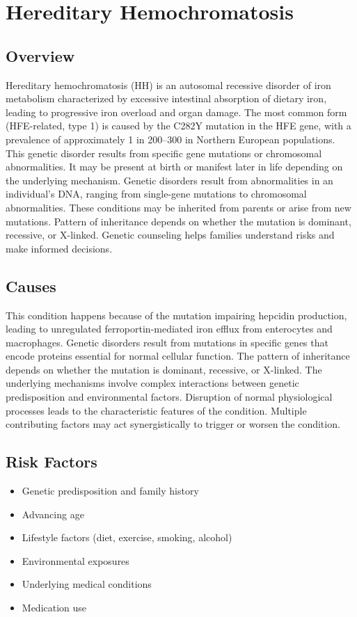 \chapter{Hereditary Hemochromatosis}
\label{sec:nutrition:Hereditary Hemochromatosis}

\section{Overview}
Hereditary hemochromatosis (HH) is an autosomal recessive disorder of iron metabolism characterized by excessive intestinal absorption of dietary iron, leading to progressive iron overload and organ damage. The most common form (HFE-related, type 1) is caused by the C282Y mutation in the HFE gene, with a prevalence of approximately 1 in 200--300 in Northern European populations. This genetic disorder results from specific gene mutations or chromosomal abnormalities. It may be present at birth or manifest later in life depending on the underlying mechanism. Genetic disorders result from abnormalities in an individual's DNA, ranging from single-gene mutations to chromosomal abnormalities. These conditions may be inherited from parents or arise from new mutations. Pattern of inheritance depends on whether the mutation is dominant, recessive, or X-linked. Genetic counseling helps families understand risks and make informed decisions.
\section{Causes}
This condition happens because of the mutation impairing hepcidin production, leading to unregulated ferroportin-mediated iron efflux from enterocytes and macrophages. Genetic disorders result from mutations in specific genes that encode proteins essential for normal cellular function. The pattern of inheritance depends on whether the mutation is dominant, recessive, or X-linked. The underlying mechanisms involve complex interactions between genetic predisposition and environmental factors. Disruption of normal physiological processes leads to the characteristic features of the condition. Multiple contributing factors may act synergistically to trigger or worsen the condition.
\section{Risk Factors}


\begin{itemize}[noitemsep]
  \item Genetic predisposition and family history
  \item Advancing age
  \item Lifestyle factors (diet, exercise, smoking, alcohol)
  \item Environmental exposures
  \item Underlying medical conditions
  \item Medication use
\end{itemize}
